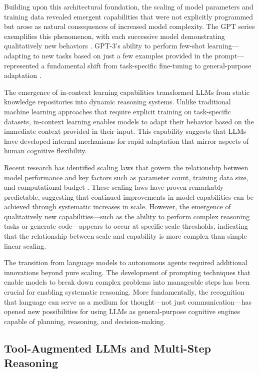 Building upon this architectural foundation, the scaling of model parameters and training data revealed emergent capabilities that were not explicitly programmed but arose as natural consequences of increased model complexity. The GPT series exemplifies this phenomenon, with each successive model demonstrating qualitatively new behaviors \cite{brown2020language, openai2023gpt4}. GPT-3's ability to perform few-shot learning—adapting to new tasks based on just a few examples provided in the prompt—represented a fundamental shift from task-specific fine-tuning to general-purpose adaptation \cite{brown2020language}.

The emergence of in-context learning capabilities transformed LLMs from static knowledge repositories into dynamic reasoning systems. Unlike traditional machine learning approaches that require explicit training on task-specific datasets, in-context learning enables models to adapt their behavior based on the immediate context provided in their input. This capability suggests that LLMs have developed internal mechanisms for rapid adaptation that mirror aspects of human cognitive flexibility.

Recent research has identified scaling laws that govern the relationship between model performance and key factors such as parameter count, training data size, and computational budget \cite{kaplan2020scaling, hoffmann2022training}. These scaling laws have proven remarkably predictable, suggesting that continued improvements in model capabilities can be achieved through systematic increases in scale. However, the emergence of qualitatively new capabilities—such as the ability to perform complex reasoning tasks or generate code—appears to occur at specific scale thresholds, indicating that the relationship between scale and capability is more complex than simple linear scaling.

The transition from language models to autonomous agents required additional innovations beyond pure scaling. The development of prompting techniques that enable models to break down complex problems into manageable steps has been crucial for enabling systematic reasoning. More fundamentally, the recognition that language can serve as a medium for thought—not just communication—has opened new possibilities for using LLMs as general-purpose cognitive engines capable of planning, reasoning, and decision-making.

\subsection{Tool-Augmented LLMs and Multi-Step Reasoning}

